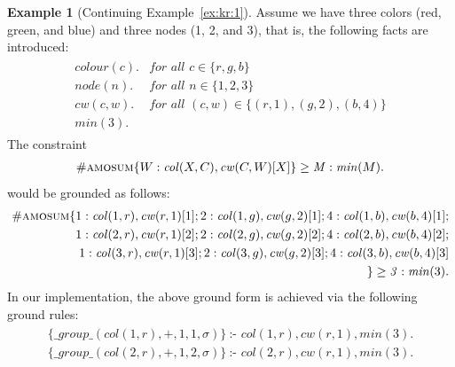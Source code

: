 \documentclass[preprint,authoryear]{elsarticle}
\theoremstyle{definition}
\newtheorem{example}{Example}[section]
\def\amosum{\ensuremath{\textsc{amosum}}\xspace}
\begin{document}
\begin{example}[Continuing Example~\ref{ex:kr:1}]
Assume we have three colors (red, green, and blue) and three nodes (1, 2, and 3), that is, the following facts are introduced:
    \begin{align*}
        \begin{array}{ll}
            \mathit{colour}(c). & \textit{for all } c  \in \{r,g,b\}   \\
            \mathit{node}(n). & \textit{for all } n  \in \{1,2,3\}   \\
            \mathit{cw}(c,w). & \textit{for all } (c, w)  \in \{(r,1),(g,2),(b,4) \}   \\
            \mathit{min}(3).
        \end{array}
    \end{align*}
    The constraint
    \begin{align*}
        \#\amosum\{ W: \mathit{col}(X,C), \mathit{cw}(C,W) [X]\} \ge \mathit{M} : \mathit{min}(M).
    \end{align*}
    {\color{blue}
    would be grounded as follows:
    {
    \small
    \begin{align*}
        \#\amosum\{
            1: \mathit{col}(1,r), \mathit{cw}(r,1) [1];
            2: \mathit{col}(1,g), \mathit{cw}(g,2) [1];
            4: \mathit{col}(1,b), \mathit{cw}(b,4) [1];\\
%
            1: \mathit{col}(2,r), \mathit{cw}(r,1) [2];
            2: \mathit{col}(2,g), \mathit{cw}(g,2) [2];
            4: \mathit{col}(2,b), \mathit{cw}(b,4) [2];\\
%
            1: \mathit{col}(3,r), \mathit{cw}(r,1) [3];
            2: \mathit{col}(3,g), \mathit{cw}(g,2) [3];
            4: \mathit{col}(3,b), \mathit{cw}(b,4) [3]\\
        \} \ge \mathit{3} : \mathit{min}(3).
    \end{align*}
    }
    In our implementation, the above ground form is achieved via the following ground rules:
    \begin{align*}
    \begin{array}{rr}
        \{\mathit{\_group\_}(\mathit{col}(1, r), + , 1, 1, \sigma)\}\ \text{:- } \mathit{col}(1, r), cw(r,1), \mathit{min}(3).\\
        \{\mathit{\_group\_}(\mathit{col}(2, r), + , 1, 2, \sigma)\}\ \text{:- } \mathit{col}(2, r), cw(r,1), \mathit{min}(3).\\

\end{array}
\end{align*}}
\end{example}
\end{document}
